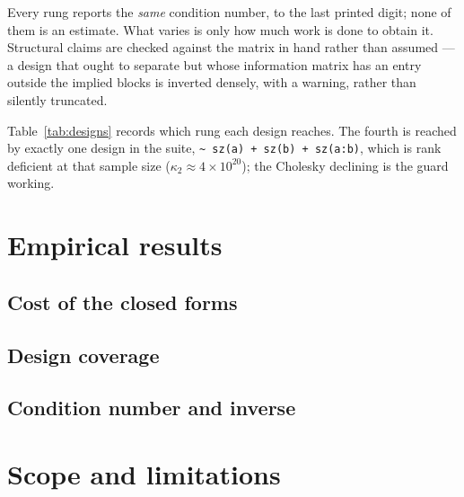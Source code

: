 \documentclass[11pt,a4paper]{article}
\theoremstyle{plain}
\theoremstyle{definition}
\newcommand{\cond}{\kappa}
\begin{document}
Every rung reports the \emph{same} condition number, to the last printed digit; none of them is
an estimate. What varies is only how much work is done to obtain it. Structural claims are
checked against the matrix in hand rather than assumed --- a design that ought to separate but
whose information matrix has an entry outside the implied blocks is inverted densely, with a
warning, rather than silently truncated.

Table~\ref{tab:designs} records which rung each design reaches. The fourth is reached by exactly
one design in the suite, \texttt{\textasciitilde\ sz(a) + sz(b) + sz(a:b)}, which is rank
deficient at that sample size ($\cond_2 \approx 4\times10^{20}$); the Cholesky declining is the
guard working.

\section{Empirical results}

\subsection{Cost of the closed forms}



\subsection{Design coverage}



\subsection{Condition number and inverse}



\section{Scope and limitations}
\end{document}
